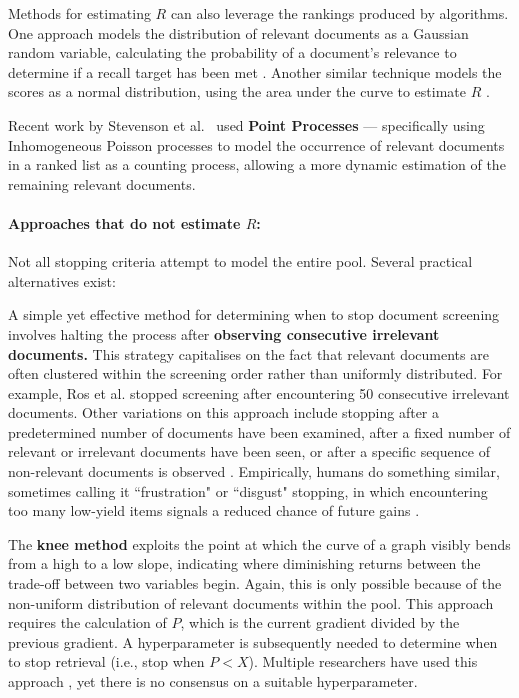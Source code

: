 \documentclass[10pt,oneside]{book}
\begin{document}
Methods for estimating $R$ can also leverage the rankings produced by algorithms.  One approach models the distribution of relevant documents as a Gaussian random variable, calculating the probability of a document's relevance to determine if a recall target has been met \cite{hollmann_ranking_2017}. Another similar technique models the scores as a normal distribution, using the area under the curve to estimate $R$ \cite{cormack_machine_2009}.

Recent work by Stevenson et al.~\cite{stevenson_stopping_2023} used \textbf{Point Processes} — specifically using Inhomogeneous Poisson processes to model the occurrence of relevant documents in a ranked list as a counting process, allowing a more dynamic estimation of the remaining relevant documents. 

\paragraph{Approaches that do not estimate $R$: }  Not all stopping criteria attempt to model the entire pool. Several practical alternatives exist:

A simple yet effective method for determining when to stop document screening involves halting the process after \textbf{ observing consecutive irrelevant documents.}  This strategy capitalises on the fact that relevant documents are often clustered within the screening order rather than uniformly distributed.  For example, Ros et al.\cite{ros_machine_2017} stopped screening after encountering 50 consecutive irrelevant documents.  Other variations on this approach include stopping after a predetermined number of documents have been examined, after a fixed number of relevant or irrelevant documents have been seen, or after a specific sequence of non-relevant documents is observed \cite{losada_when_2019}. Empirically, humans do something similar, sometimes calling it ``frustration" or ``disgust" stopping, in which encountering too many low-yield items signals a reduced chance of future gains \cite{cooper_selecting_1973, kraft_stopping_1979, ilani_analysis_2024}.

The \textbf{knee method} exploits the point at which the curve of a graph visibly bends from a high to a low slope, indicating where diminishing returns between the trade-off between two variables begin. Again, this is only possible because of the non-uniform distribution of relevant documents within the pool. This approach requires the calculation of $P$, which is the current gradient divided by the previous gradient. A hyperparameter is subsequently needed to determine when to stop retrieval (i.e., stop when $P < X$). Multiple researchers have used this approach \cite{cormack_engineering_2016, li_when_2020}, yet there is no consensus on a suitable hyperparameter.  
\end{document}
